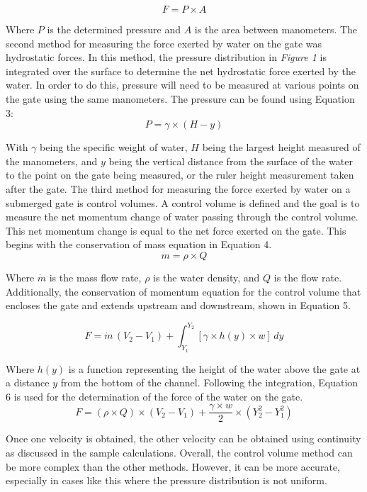 \documentclass{article}
\begin{document}
\begin{equation} 
    F=P\times A
\end{equation}
\par Where $P$ is the determined pressure and $A$ is the area between manometers. The second method for measuring the force exerted by water on the gate was hydrostatic forces. In this method, the pressure distribution in \emph{Figure 1} is integrated over the surface to determine the net hydrostatic force exerted by the water. In order to do this, pressure will need to be measured at various points on the gate using the same manometers. The pressure can be found using Equation 3: 
\begin{equation} 
    P=\gamma \times (H-y)
\end{equation} 
\par With $\gamma$ being the specific weight of water, $H$ being the largest height measured of the manometers, and $y$ being the vertical distance from the surface of the water to the point on the gate being measured, or the ruler height measurement taken after the gate. The third method for measuring the force exerted by water on a submerged gate is control volumes. A control volume is defined and the goal is to measure the net momentum change of water passing through the control volume. This net momentum change is equal to the net force exerted on the gate. This begins with the conservation of mass equation in Equation 4.
\begin{equation} 
    \dot{m}=\rho\times Q 
\end{equation}
\par Where $\dot{m}$ is the mass flow rate, $\rho$ is the water density, and $Q$ is the flow rate. Additionally, the conservation of momentum equation for the control volume that encloses the gate and extends upstream and downstream, shown in Equation 5.

\begin{equation} 
    F =\dot{m}\, (V_2 - V_1) + \int_{Y_1}^{Y_2}[\gamma\times h(y)\times w]\, dy
\end{equation}
\par Where $h(y)$ is a function representing the height of the water above the gate at a distance $y$ from the bottom of the channel. Following the integration, Equation 6 is used for the determination of the force of the water on the gate.
\begin{equation} 
    F=(\rho\times Q)\times(V_2-V_1)+\frac{\gamma\times w}{2}\times(Y_2^2-Y_1^2)
\end{equation}
\par Once one velocity is obtained, the other velocity can be obtained using continuity as discussed in the sample calculations. Overall, the control volume method can be more complex than the other methods. However, it can be more accurate, especially in cases like this where the pressure distribution is not uniform.
\newpage
\end{document}
